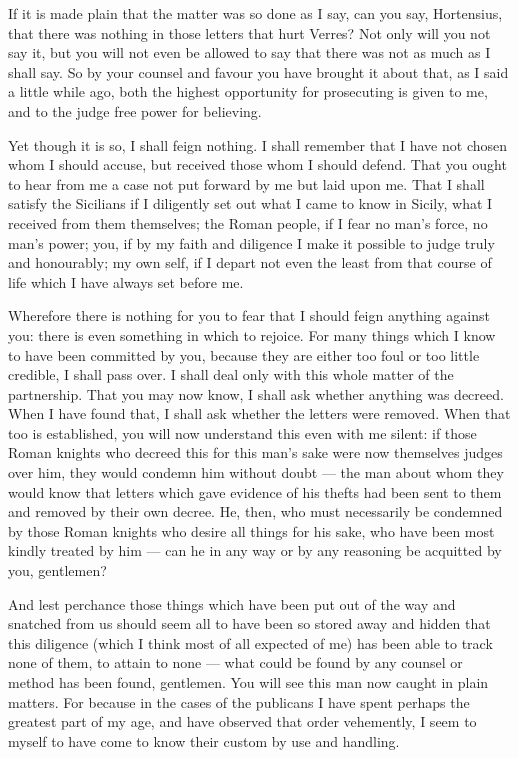  If it is made plain that the matter was so done as I say, can you say, Hortensius, that there was nothing in those letters that hurt Verres? Not only will you not say it, but you will not even be allowed to say that there was not as much as I shall say. So by your counsel and favour you have brought it about that, as I said a little while ago, both the highest opportunity for prosecuting is given to me, and to the judge free power for believing.

 Yet though it is so, I shall feign nothing. I shall remember that I have not chosen whom I should accuse, but received those whom I should defend. That you ought to hear from me a case not put forward by me but laid upon me. That I shall satisfy the Sicilians if I diligently set out what I came to know in Sicily, what I received from them themselves; the Roman people, if I fear no man's force, no man's power; you, if by my faith and diligence I make it possible to judge truly and honourably; my own self, if I depart not even the least from that course of life which I have always set before me.

 Wherefore there is nothing for you to fear that I should feign anything against you: there is even something in which to rejoice. For many things which I know to have been committed by you, because they are either too foul or too little credible, I shall pass over. I shall deal only with this whole matter of the partnership. That you may now know, I shall ask whether anything was decreed. When I have found that, I shall ask whether the letters were removed. When that too is established, you will now understand this even with me silent: if those Roman knights who decreed this for this man's sake were now themselves judges over him, they would condemn him without doubt --- the man about whom they would know that letters which gave evidence of his thefts had been sent to them and removed by their own decree. He, then, who must necessarily be condemned by those Roman knights who desire all things for his sake, who have been most kindly treated by him --- can he in any way or by any reasoning be acquitted by you, gentlemen?

 And lest perchance those things which have been put out of the way and snatched from us should seem all to have been so stored away and hidden that this diligence (which I think most of all expected of me) has been able to track none of them, to attain to none --- what could be found by any counsel or method has been found, gentlemen. You will see this man now caught in plain matters. For because in the cases of the publicans I have spent perhaps the greatest part of my age, and have observed that order vehemently, I seem to myself to have come to know their custom by use and handling.


